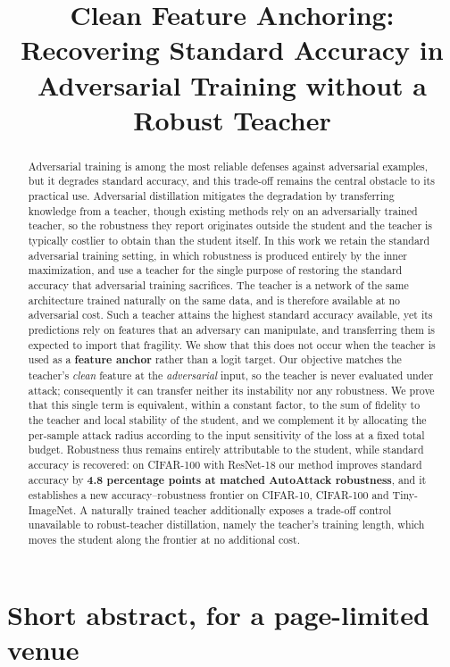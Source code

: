 \documentclass[11pt]{article}
\title{Clean Feature Anchoring:\\
Recovering Standard Accuracy in Adversarial Training without a Robust Teacher}
\author{}
\date{}
\begin{document}
\maketitle

\begin{abstract}
Adversarial training is among the most reliable defenses against adversarial examples, but it
degrades standard accuracy, and this trade-off remains the central obstacle to its practical use.
Adversarial distillation mitigates the degradation by transferring knowledge from a teacher, though
existing methods rely on an adversarially trained teacher, so the robustness they report originates
outside the student and the teacher is typically costlier to obtain than the student itself. In this
work we retain the standard adversarial training setting, in which robustness is produced entirely by
the inner maximization, and use a teacher for the single purpose of restoring the standard accuracy
that adversarial training sacrifices. The teacher is a network of the same architecture trained
naturally on the same data, and is therefore available at no adversarial cost.
Such a teacher attains the highest standard accuracy available, yet its predictions rely on features
that an adversary can manipulate, and transferring them is expected to import that fragility. We show
that this does not occur when the teacher is used as a \textbf{feature anchor} rather than a logit
target. Our objective matches the teacher's \emph{clean} feature at the \emph{adversarial} input, so
the teacher is never evaluated under attack; consequently it can transfer neither its instability nor
any robustness. We prove that this single term is equivalent, within a constant factor, to the sum of
fidelity to the teacher and local stability of the student, and we complement it by allocating the
per-sample attack radius according to the input sensitivity of the loss at a fixed total budget.
Robustness thus remains entirely attributable to the student, while standard accuracy is recovered:
on CIFAR-100 with ResNet-18 our method improves standard accuracy by \textbf{4.8 percentage points at
matched AutoAttack robustness}, and it establishes a new accuracy--robustness frontier on CIFAR-10,
CIFAR-100 and Tiny-ImageNet. A naturally trained teacher additionally exposes a trade-off control
unavailable to robust-teacher distillation, namely the teacher's training length, which moves the
student along the frontier at no additional cost.
\end{abstract}

\section*{Short abstract, for a page-limited venue}
\end{document}
